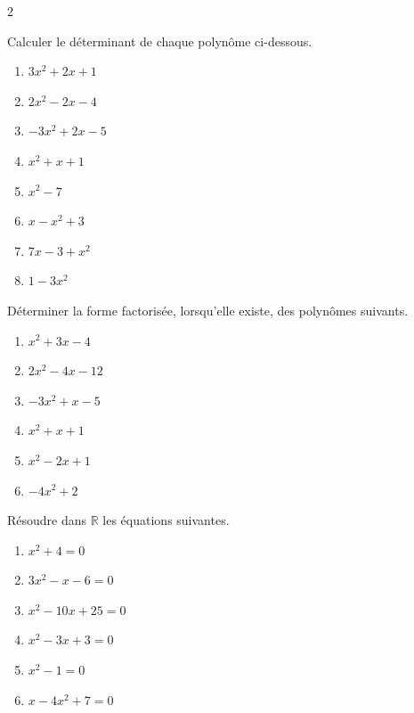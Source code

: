\documentclass[a4paper,12pt]{article}
\title{
\centering
\tcbset{colframe=BlackSav,colback=GrayBG}
\tcbox[tikznode]{
Chapitre 1 \\ Polynômes du second degré 
}
}
\author{}
\date{}
\begin{document}
\maketitle

\begin{multicols}{2}

\begin{exercice}[title=Exercice 1 \quad$\star$\quad\  {[Calculer]}]{}{}
Calculer le déterminant de chaque polynôme ci-dessous.
\begin{enumerate}
    \item \(3x^2 + 2x + 1\)
    \item \(2x^2 - 2x - 4\)
    \item \(-3x^2 + 2x - 5\)
    \item \(x^2 + x + 1\)
    \item \(x^2 - 7\)
    \item \(x - x^2 + 3\)
    \item \(7x - 3 + x^2\)
    \item \(1 - 3x^2\)
\end{enumerate}
\end{exercice}

\begin{exercice}[title=Exercice 2 \quad$\star$\quad\  {Calculer}]{}{}
Déterminer la forme factorisée, lorsqu’elle existe, des polynômes suivants.
\begin{enumerate}
    \item \(x^2 + 3x - 4\)
    \item \(2x^2 - 4x - 12\)
    \item \(-3x^2 + x - 5\)
    \item \(x^2 + x + 1\)
    \item \(x^2 - 2x + 1\)
    \item \(-4x^2 + 2\)
\end{enumerate}
\end{exercice}

\begin{exercice}[title=Exercice 3 \quad$\star$\quad\ {[Calculer]}]{}{}
Résoudre dans \( \mathbb{R} \) les équations suivantes.
\begin{enumerate}
    \item \(x^2 + 4 = 0\)
    \item \(3x^2 - x - 6 = 0\)
    \item \(x^2 - 10x + 25 = 0\)
    \item \(x^2 - 3x + 3 = 0\)
    \item \(x^2 - 1 = 0\)
    \item \(x - 4x^2 + 7 = 0\)
\end{enumerate}
\end{exercice}


\end{multicols}
\end{document}
